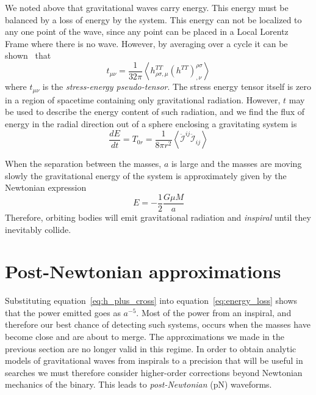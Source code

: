 We noted above that gravitational waves carry energy.  This energy
must be balanced by a loss of energy by the system.  This energy can
not be localized to any one point of the wave, since any point can be
placed in a Local Lorentz Frame where there is no wave.  However, by
averaging over a cycle it can be shown~\cite{carrollTextbook} that
%
\begin{equation}
t_{\mu\nu} = \frac{1}{32 \pi} \left\langle h^{TT}_{\rho \sigma,\mu}
(h^{TT})^{\rho\sigma}_{,\nu} \right\rangle
\end{equation}
%
where $t_{\mu\nu}$ is the \emph{stress-energy pseudo-tensor}.  The
stress energy tensor itself is zero in a region of spacetime
containing only gravitational radiation.  However, $t$ may be used to
describe the energy content of such radiation, and we find the flux of
energy in the radial direction out of a sphere enclosing a gravitating
system is
%
\begin{equation}
\label{eq:energy_loss}
\frac{dE}{dt} = T_{0r} = \frac{1}{8 \pi r^2} \left\langle \ddot{\mathcal{I}}^{ij}
\ddot{\mathcal{I}}_{ij} \right\rangle
\end{equation}

When the separation between the masses, $a$ is large and the masses are
moving slowly the gravitational energy of the system is approximately
given by the Newtonian expression
%
\begin{equation*}
E = - \frac{1}{2} \frac{G \mu M}{a}
\end{equation*}
%
Therefore, orbiting bodies will emit gravitational radiation and
\emph{inspiral} until they inevitably collide.

\section{Post-{N}ewtonian approximations}
\label{sec:PNWaveforms}

Substituting equation~\ref{eq:h_plus_cross} into
equation~\ref{eq:energy_loss} shows that the power emitted goes as
$a^{-5}$.  Most of the power from an inspiral, and therefore our best
chance of detecting such systems, occurs when the masses have become
close and are about to merge.  The approximations we made in the
previous section are no longer valid in this regime.  In order to
obtain analytic models of gravitational waves from inspirals to a
precision that will be useful in searches we must therefore consider
higher-order corrections beyond Newtonian mechanics of the binary.
This leads to \emph{post-Newtonian} (pN) waveforms.

